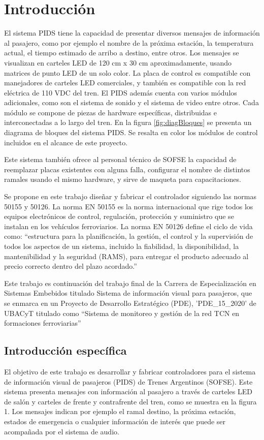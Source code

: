 \documentclass[
11pt, %
]{charter}
\begin{document}
\pagebreak


\section{Introducción}


El sistema PIDS tiene la capacidad de presentar diversos mensajes de información al pasajero, como por ejemplo el nombre de la próxima estación, la temperatura actual, el tiempo estimado de arribo a destino, entre otros. Los mensajes se visualizan en carteles LED de 120 cm x 30 cm aproximadamente, usando matrices de punto LED de un solo color. La placa de control es compatible con manejadores de carteles LED comerciales, y también es compatible con la red eléctrica de 110 VDC del tren. El PIDS además cuenta con varios módulos adicionales, como son el sistema de sonido y el sistema de video entre otros. Cada módulo se compone de piezas de hardware específicas, distribuidas e interconectadas a lo largo del tren. En la figura \ref{fig:diagBloques} se presenta un diagrama de bloques del sistema PIDS. Se resalta en color los módulos de control incluidos en el alcance de este proyecto.

Este sistema también ofrece al personal técnico de SOFSE la capacidad de reemplazar placas existentes con alguna falla, configurar el nombre de distintos ramales usando el mismo hardware, y sirve de maqueta para capacitaciones.

Se propone en este trabajo diseñar y fabricar el controlador siguiendo las normas 50155 y 50126. La norma EN 50155 es la norma internacional que rige todos los equipos electrónicos de control, regulación, protección y suministro que se instalan en los vehículos ferroviarios. La norma EN 50126 define el ciclo de vida como: “estructura para la planificación, la gestión, el control y la supervisión de todos los aspectos de un sistema, incluido la fiabilidad, la disponibilidad, la mantenibilidad y la seguridad (RAMS), para entregar el producto adecuado al precio correcto dentro del plazo acordado.”


Este trabajo es continuación del trabajo final de la Carrera de Especialización en Sistemas Embebidos titulado Sistema de información visual para pasajeros, que se enmarca en un Proyecto de Desarrollo Estratégico (PDE), 'PDE\_15\_2020' de UBACyT titulado como “Sistema de monitoreo y gestión de la red TCN en formaciones ferroviarias”

\label{sec:intro}
\subsection{Introducción específica}
El objetivo de este trabajo es desarrollar y fabricar controladores para el sistema de información visual de pasajeros (PIDS) de Trenes Argentinos (SOFSE). Este sistema presenta mensajes con información al pasajero a través de carteles LED de salón y carteles de frente y contrafrente del tren, como se muestra en la figura 1. Los mensajes indican por ejemplo el ramal destino, la próxima estación, estados de emergencia o cualquier información de interés que puede ser acompañada por el sistema de audio.
\end{document}
